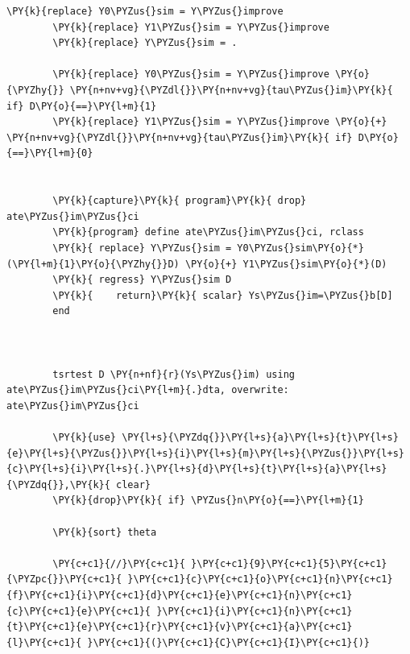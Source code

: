 \documentclass[11pt,notitlepage]{article}\usepackage[]{graphicx}\usepackage[]{color}
\makeatletter
\newenvironment{kframe}{%
 \def\at@end@of@kframe{}%
 \ifinner\ifhmode%
  \def\at@end@of@kframe{\end{minipage}}%
  \begin{minipage}{\columnwidth}%
 \fi\fi%
 \def\FrameCommand##1{\hskip\@totalleftmargin \hskip-\fboxsep
 \colorbox{shadecolor}{##1}\hskip-\fboxsep
     \hskip-\linewidth \hskip-\@totalleftmargin \hskip\columnwidth}%
 \MakeFramed {\advance\hsize-\width
   \@totalleftmargin\z@ \linewidth\hsize
   \@setminipage}}%
 {\par\unskip\endMakeFramed%
 \at@end@of@kframe}
\newenvironment{knitrout}{}{} %
\makeatother
\begin{document}
\begin{enumerate}[a)]
\begin{knitrout}
\begin{kframe}
\begin{Verbatim}[commandchars=\\\{\}]
        \PY{k}{replace} Y0\PYZus{}sim = Y\PYZus{}improve
        \PY{k}{replace} Y1\PYZus{}sim = Y\PYZus{}improve
        \PY{k}{replace} Y\PYZus{}sim = .
        
        \PY{k}{replace} Y0\PYZus{}sim = Y\PYZus{}improve \PY{o}{\PYZhy{}} \PY{n+nv+vg}{\PYZdl{}}\PY{n+nv+vg}{tau\PYZus{}im}\PY{k}{ if} D\PY{o}{==}\PY{l+m}{1}
        \PY{k}{replace} Y1\PYZus{}sim = Y\PYZus{}improve \PY{o}{+} \PY{n+nv+vg}{\PYZdl{}}\PY{n+nv+vg}{tau\PYZus{}im}\PY{k}{ if} D\PY{o}{==}\PY{l+m}{0}
        
        
        \PY{k}{capture}\PY{k}{ program}\PY{k}{ drop} ate\PYZus{}im\PYZus{}ci
        \PY{k}{program} define ate\PYZus{}im\PYZus{}ci, rclass
        \PY{k}{	replace} Y\PYZus{}sim = Y0\PYZus{}sim\PY{o}{*}(\PY{l+m}{1}\PY{o}{\PYZhy{}}D) \PY{o}{+} Y1\PYZus{}sim\PY{o}{*}(D) 
        \PY{k}{	regress} Y\PYZus{}sim D 
        \PY{k}{    return}\PY{k}{ scalar} Ys\PYZus{}im=\PYZus{}b[D]	
        end
        
        
        
        tsrtest D \PY{n+nf}{r}(Ys\PYZus{}im) using ate\PYZus{}im\PYZus{}ci\PY{l+m}{.}dta, overwrite: ate\PYZus{}im\PYZus{}ci
        
        \PY{k}{use} \PY{l+s}{\PYZdq{}}\PY{l+s}{a}\PY{l+s}{t}\PY{l+s}{e}\PY{l+s}{\PYZus{}}\PY{l+s}{i}\PY{l+s}{m}\PY{l+s}{\PYZus{}}\PY{l+s}{c}\PY{l+s}{i}\PY{l+s}{.}\PY{l+s}{d}\PY{l+s}{t}\PY{l+s}{a}\PY{l+s}{\PYZdq{}},\PY{k}{ clear}
        \PY{k}{drop}\PY{k}{ if} \PYZus{}n\PY{o}{==}\PY{l+m}{1}
        
        \PY{k}{sort} theta
        
        \PY{c+c1}{//}\PY{c+c1}{ }\PY{c+c1}{9}\PY{c+c1}{5}\PY{c+c1}{\PYZpc{}}\PY{c+c1}{ }\PY{c+c1}{c}\PY{c+c1}{o}\PY{c+c1}{n}\PY{c+c1}{f}\PY{c+c1}{i}\PY{c+c1}{d}\PY{c+c1}{e}\PY{c+c1}{n}\PY{c+c1}{c}\PY{c+c1}{e}\PY{c+c1}{ }\PY{c+c1}{i}\PY{c+c1}{n}\PY{c+c1}{t}\PY{c+c1}{e}\PY{c+c1}{r}\PY{c+c1}{v}\PY{c+c1}{a}\PY{c+c1}{l}\PY{c+c1}{ }\PY{c+c1}{(}\PY{c+c1}{C}\PY{c+c1}{I}\PY{c+c1}{)}
        

\end{Verbatim}
\end{kframe}
\end{knitrout}
\end{enumerate}
\end{document}
